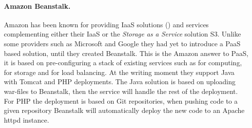 \paragraph{Amazon Beanstalk.}

Amazon has been known for providing IaaS solutions () and services complementing 
either their IaaS or the \emph{Storage as a Service} solution S3.
Unlike some providers such as Microsoft and Google they had yet to introduce
a PaaS based solution, until they created Beanstalk.
This is the Amazon answer to PaaS, it is based on pre-configuring 
a stack of existing services such as  for computing, 
 for storage and  for load balancing.
At the writing moment they support Java with Tomcat and PHP deployments.
The Java solution is based on uploading war-files to Beanstalk, then 
the service will handle the rest of the deployment.
For PHP the deployment is based on Git repositories, when pushing
code to a given repository Beanstalk will automatically deploy the new code
to an Apache httpd instance.


